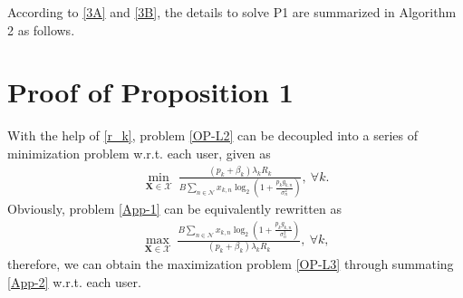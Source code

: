 \documentclass[journal]{IEEEtran}
\begin{document}
    According to \ref{3A} and \ref{3B}, the details to solve P1 are summarized in Algorithm 2 as follows.
    



    
    
    \appendices
    \def\thesection{\Alph{section}}%
    \def\thesectiondis{\Alph{section}}%
    \section{Proof of Proposition 1}
    \setcounter{equation}{0}
    \renewcommand{\theequation}{A.\arabic{equation}}
    With the help of \eqref{r_k}, problem \eqref{OP-L2} can be decoupled into a series of minimization problem w.r.t. each user, given as
    \begin{equation}
        \label{App-1}
        \begin{aligned}
            \min_{\boldsymbol{X}\in\mathcal{X}}~\frac{(p_{k}+\beta_{k})\lambda_{k}R_{k}}{B\sum_{n\in\mathcal{N}}x_{k,n}\log_2\left(1+\frac{p_{k}g_{k,n}}{\sigma_n^2}\right)},~\forall k.
        \end{aligned}
    \end{equation}
    Obviously, problem \eqref{App-1} can be equivalently rewritten as
    \begin{equation}
        \label{App-2}
        \begin{aligned}
            \max_{\boldsymbol{X}\in\mathcal{X}}~\frac{B\sum_{n\in\mathcal{N}}x_{k,n}\log_2\left(1+\frac{p_{k}g_{k,n}}{\sigma_n^2}\right)}{(p_{k}+\beta_{k})\lambda_{k}R_{k}},~\forall k,
        \end{aligned}
    \end{equation}
    therefore, we can obtain the maximization problem \eqref{OP-L3} through summating \eqref{App-2} w.r.t. each user.
    \printbibliography
\end{document}

